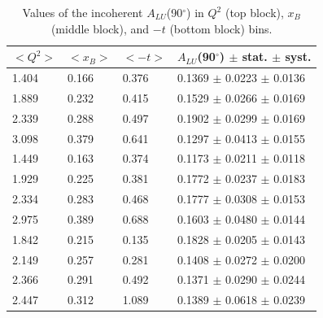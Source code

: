 \documentclass{article}
\begin{document}
\begin{table}[!h]
\begin{center}
\begin{tabular}{||l|l|l|l||}
\hline
 $<Q^{2}>$ & $<x_{B}>$ & $<-t>$  & $A_{LU}$(90$^{\circ}$) $\pm$ stat. $\pm$ syst.\\
 \hline 
  1.404 & 0.166 & 0.376 & 0.1369 $\pm$ 0.0223 $\pm$ 0.0136\\   
  1.889 & 0.232 & 0.415 & 0.1529 $\pm$ 0.0266 $\pm$ 0.0169\\   
  2.339 & 0.288 & 0.497 & 0.1902 $\pm$ 0.0299 $\pm$ 0.0169\\   
  3.098 & 0.379 & 0.641 & 0.1297 $\pm$ 0.0413 $\pm$ 0.0155\\   
 \hline                   
  1.449 & 0.163 & 0.374 & 0.1173 $\pm$ 0.0211 $\pm$ 0.0118\\   
  1.929 & 0.225 & 0.381 & 0.1772 $\pm$ 0.0237 $\pm$ 0.0183\\   
  2.334 & 0.283 & 0.468 & 0.1777 $\pm$ 0.0308 $\pm$ 0.0153\\   
  2.975 & 0.389 & 0.688 & 0.1603 $\pm$ 0.0480 $\pm$ 0.0144\\   
 \hline                   
  1.842 & 0.215 & 0.135 & 0.1828 $\pm$ 0.0205 $\pm$ 0.0143\\   
  2.149 & 0.257 & 0.281 & 0.1408 $\pm$ 0.0272 $\pm$ 0.0200\\   
  2.366 & 0.291 & 0.492 & 0.1371 $\pm$ 0.0290 $\pm$ 0.0244\\   
  2.447 & 0.312 & 1.089 & 0.1389 $\pm$ 0.0618 $\pm$ 0.0239\\   

 \hline
 \hline
 \end{tabular}
 \caption{Values of the incoherent $A_{LU}$(90$^{\circ}$) in $Q^2$ (top block), $x_B$ (middle block), and $-t$ (bottom block) bins.}
 \label{table:InCoh_BSA_90}
 \end{center}
\end{table}




\end{document}
